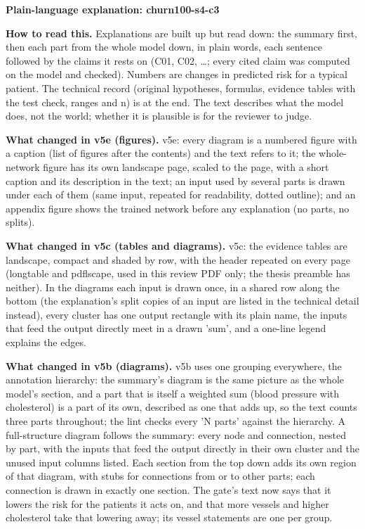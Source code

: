 \documentclass[a4paper,10pt]{article}
\begin{document}
\begin{center}{\Large\bfseries Plain-language explanation: churn100-s4-c3\par}\vspace{2mm}{\small AI-assisted drafts for review. Nothing here has been verified by a person.\par}\end{center}
\noindent\textbf{How to read this.} Explanations are built up but read down: the summary first, then each part from the whole model down, in plain words, each sentence followed by the claims it rests on (C01, C02, \ldots; every cited claim was computed on the model and checked). Numbers are changes in predicted risk for a typical patient. The technical record (original hypotheses, formulas, evidence tables with the test check, ranges and n) is at the end. The text describes what the model does, not the world; whether it is plausible is for the reviewer to judge.
\par\medskip\noindent\textbf{What changed in v5e (figures).} v5e: every diagram is a numbered figure with a caption (list of figures after the contents) and the text refers to it; the whole-network figure has its own landscape page, scaled to the page, with a short caption and its description in the text; an input used by several parts is drawn under each of them (same input, repeated for readability, dotted outline); and an appendix figure shows the trained network before any explanation (no parts, no splits).
\par\medskip\noindent\textbf{What changed in v5c (tables and diagrams).} v5c: the evidence tables are landscape, compact and shaded by row, with the header repeated on every page (longtable and pdflscape, used in this review PDF only; the thesis preamble has neither). In the diagrams each input is drawn once, in a shared row along the bottom (the explanation's split copies of an input are listed in the technical detail instead), every cluster has one output rectangle with its plain name, the inputs that feed the output directly meet in a drawn 'sum', and a one-line legend explains the edges.
\par\medskip\noindent\textbf{What changed in v5b (diagrams).} v5b uses one grouping everywhere, the annotation hierarchy: the summary's diagram is the same picture as the whole model's section, and a part that is itself a weighted sum (blood pressure with cholesterol) is a part of its own, described as one that adds up, so the text counts three parts throughout; the lint checks every 'N parts' against the hierarchy. A full-structure diagram follows the summary: every node and connection, nested by part, with the inputs that feed the output directly in their own cluster and the unused input columns listed. Each section from the top down adds its own region of that diagram, with stubs for connections from or to other parts; each connection is drawn in exactly one section. The gate's text now says that it lowers the risk for the patients it acts on, and that more vessels and higher cholesterol take that lowering away; its vessel statements are one per group.
\end{document}
